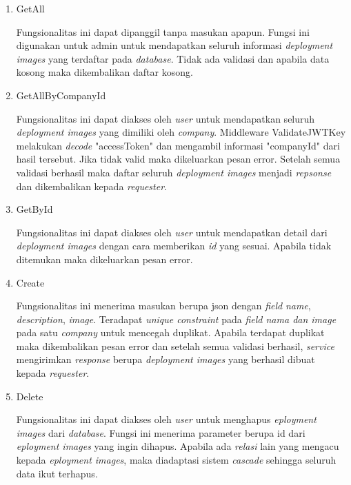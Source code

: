 \begin{enumerate}
    \item GetAll

          Fungsionalitas ini dapat dipanggil tanpa masukan apapun. Fungsi ini digunakan untuk admin untuk mendapatkan seluruh informasi \textit{deployment images} yang terdaftar pada \textit{database}. Tidak ada validasi dan apabila data kosong maka dikembalikan daftar kosong.

    \item GetAllByCompanyId

          Fungsionalitas ini dapat diakses oleh \textit{user} untuk mendapatkan seluruh \textit{deployment images} yang dimiliki oleh \textit{company}. Middleware ValidateJWTKey  melakukan \textit{decode} "accessToken" dan mengambil informasi "companyId" dari hasil tersebut. Jika tidak valid maka dikeluarkan pesan error. Setelah semua validasi berhasil maka daftar seluruh \textit{deployment images} menjadi \textit{repsonse} dan dikembalikan kepada \textit{requester}.

    \item GetById

          Fungsionalitas ini dapat diakses oleh \textit{user} untuk mendapatkan detail dari \textit{deployment images} dengan cara memberikan \textit{id} yang sesuai. Apabila tidak ditemukan maka dikeluarkan pesan error.

    \item Create

          Fungsionalitas ini menerima masukan berupa json dengan \textit{field} \textit{name}, \textit{description}, \textit{image}. Teradapat \textit{unique constraint} pada \textit{field nama dan image} pada satu \textit{company} untuk mencegah duplikat. Apabila terdapat duplikat maka dikembalikan pesan error dan setelah semua validasi berhasil, \textit{service} mengirimkan \textit{response} berupa \textit{deployment images} yang berhasil dibuat kepada \textit{requester}.

    \item Delete

          Fungsionalitas ini dapat diakses oleh \textit{user} untuk menghapus \textit{eployment images} dari \textit{database}. Fungsi ini menerima parameter berupa id dari \textit{eployment images} yang ingin dihapus. Apabila ada \textit{relasi} lain yang mengacu kepada \textit{eployment images}, maka diadaptasi sistem \textit{cascade} sehingga seluruh data ikut terhapus.

\end{enumerate}

